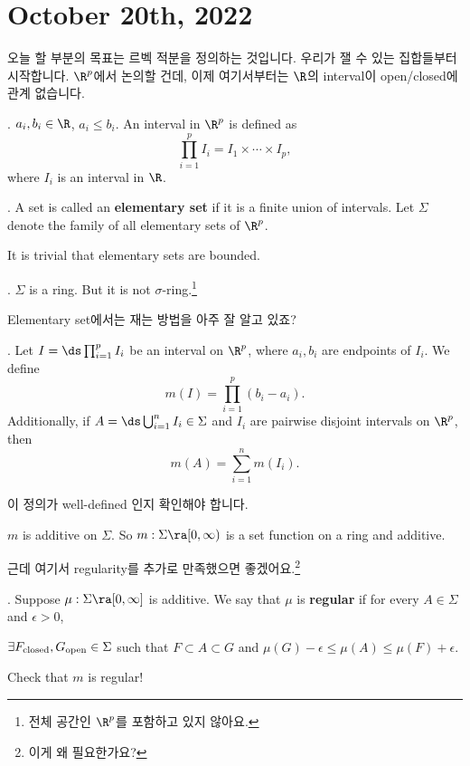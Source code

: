 \section*{October 20th, 2022}

오늘 할 부분의 목표는 르벡 적분을 정의하는 것입니다. 우리가 잴 수 있는 집합들부터 시작합니다. \(\R^p\)에서 논의할 건데, 이제 여기서부터는 \(\R\)의 interval이 open/closed에 관계 없습니다.

.  \(a_i, b_i \in \R\), \(a_i \leq b_i\). An interval in \(\R^p\) is defined as
\[
    \prod_{i=1}^p I_i = I_1 \times \cdots \times I_p,
\]
where \(I_i\) is an interval in \(\R\).

.  A set is called an \textbf{elementary set} if it is a finite union of intervals. Let \(\Sigma\) denote the family of all elementary sets of \(\R^p\).

\rmk It is trivial that elementary sets are bounded.

\prop. \(\Sigma\) is a ring. But it is not \(\sigma\)-ring.\footnote{전체 공간인 \(\R^p\)를 포함하고 있지 않아요.}

\bigskip

Elementary set에서는 재는 방법을 아주 잘 알고 있죠?

. Let \(I = \ds \prod_{i=1}^p I_i\) be an interval on \(\R^p\), where \(a_i, b_i\) are endpoints of \(I_i\). We define
\[
    m(I) = \prod_{i=1}^p (b_i - a_i).
\]
Additionally, if \(A = \ds\bigcup_{i=1}^n I_i \in \Sigma\) and \(I_i\) are pairwise disjoint intervals on \(\R^p\), then
\[
    m(A) = \sum_{i=1}^n m(I_i).
\]

이 정의가 well-defined 인지 확인해야 합니다.

\rmk \(m\) is additive on \(\Sigma\). So \(m : \Sigma \ra [0, \infty)\) is a set function on a ring and additive.

근데 여기서 regularity를 추가로 만족했으면 좋겠어요.\footnote{이게 왜 필요한가요?}

.  Suppose \(\mu: \Sigma \ra [0, \infty]\) is additive. We say that \(\mu\) is \textbf{regular} if for every \(A \in \Sigma\) and \(\epsilon > 0\),
\begin{center}
    \(\exists F_{\rm{closed}}, G_{\rm{open}} \in \Sigma\) such that \(F \subset A \subset G\) and \(\mu(G) - \epsilon \leq \mu(A) \leq \mu(F) + \epsilon\).
\end{center}

\rmk Check that \(m\) is regular!

